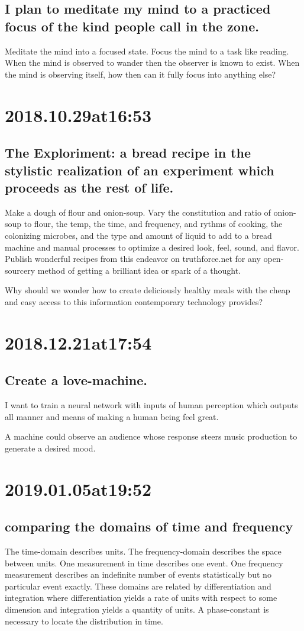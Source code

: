 \subsection*{ I plan to meditate my mind to a practiced focus of the kind people call in the zone. }
Meditate the mind into a focused state.
Focus the mind to a task like reading.
When the mind is observed to wander then the observer is known to exist.
When the mind is observing itself, how then can it fully focus into anything else?

\section*{ 2018.10.29at16:53 }
\subsection*{ The Exploriment: a bread recipe in the stylistic realization of an experiment  which proceeds as the rest of life. }
Make a dough of flour and onion-soup.
Vary the constitution and ratio of onion-soup to flour, the temp, the time, and frequency, and rythms of cooking, the colonizing microbes, and the type and amount of liquid to add to a bread machine and manual processes to optimize a desired look, feel, sound, and flavor.
Publish wonderful recipes from this endeavor on truthforce.net for any open-sourcery method of getting a brilliant idea or spark of a thought.

Why should we wonder how to create deliciously healthy meals with the cheap and easy access to this information contemporary technology provides?

\section*{ 2018.12.21at17:54 }
\subsection*{ Create a love-machine. }
I want to train a neural network with inputs of human perception which outputs all manner and means of making a human being feel great.

A machine could observe an audience whose response steers music production to generate a desired mood.

\section*{ 2019.01.05at19:52 }
\subsection*{ comparing the domains of time and frequency }
The time-domain describes units. The frequency-domain describes the space between units. One measurement in time describes one event. One frequency measurement describes an indefinite number of events statistically but no particular event exactly. These domains are related by differentiation and integration where differentiation yields a rate of units with respect to some dimension and integration yields a quantity of units. A phase-constant is necessary to locate the distribution in time.
